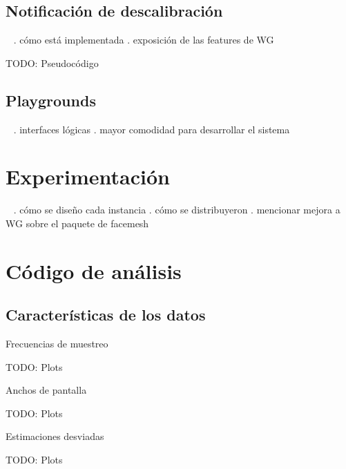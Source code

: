 \documentclass[aspectratio=169]{beamer}
\begin{document}
\subsection{Notificación de descalibración}

\begin{frame}{~}
. cómo está implementada
. exposición de las features de WG

TODO: Pseudocódigo
\end{frame}

\subsection{Playgrounds}

\begin{frame}{~}
. interfaces lógicas
. mayor comodidad para desarrollar el sistema
\end{frame}

\section{Experimentación}

\begin{frame}{~}
. cómo se diseño cada instancia
. cómo se distribuyeron
. mencionar mejora a WG sobre el paquete de facemesh
\end{frame}

\section{Código de análisis}

\subsection{Características de los datos}

\begin{frame}{Frecuencias de muestreo}

TODO: Plots

\end{frame}

\begin{frame}{Anchos de pantalla}

TODO: Plots

\end{frame}

\begin{frame}{Estimaciones desviadas}

TODO: Plots

\end{frame}
\end{document}

